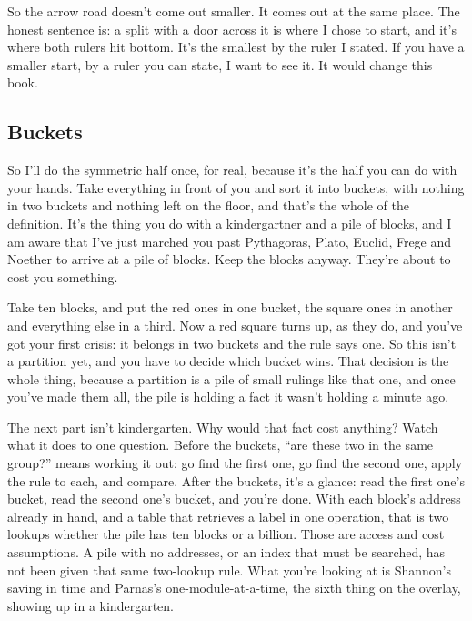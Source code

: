\documentclass[11pt,twoside]{article}
\theoremstyle{thielethm}
\theoremstyle{thieledef}
\theoremstyle{thieledef}
\theoremstyle{thieledef}
\theoremstyle{thielethm}
\theoremstyle{thieleobs}
\theoremstyle{thielethm}
\begin{document}
So the arrow road doesn't come out smaller. It comes out at the same place. The honest sentence is: a split with a door across it is where I chose to start, and it's where both rulers hit bottom. It's the smallest by the ruler I stated. If you have a smaller start, by a ruler you can state, I want to see it. It would change this book.

\subsection{Buckets}

So I'll do the symmetric half once, for real, because it's the half you can do with your hands. Take everything in front of you and sort it into buckets, with nothing in two buckets and nothing left on the floor, and that's the whole of the definition. It's the thing you do with a kindergartner and a pile of blocks, and I am aware that I've just marched you past Pythagoras, Plato, Euclid, Frege and Noether to arrive at a pile of blocks. Keep the blocks anyway. They're about to cost you something.

Take ten blocks, and put the red ones in one bucket, the square ones in another and everything else in a third. Now a red square turns up, as they do, and you've got your first crisis: it belongs in two buckets and the rule says one. So this isn't a partition yet, and you have to decide which bucket wins. That decision is the whole thing, because a partition is a pile of small rulings like that one, and once you've made them all, the pile is holding a fact it wasn't holding a minute ago.

The next part isn't kindergarten. Why would that fact cost anything? Watch what it does to one question. Before the buckets, ``are these two in the same group?'' means working it out: go find the first one, go find the second one, apply the rule to each, and compare. After the buckets, it's a glance: read the first one's bucket, read the second one's bucket, and you're done. With each block's address already in hand, and a table that retrieves a label in one operation, that is two lookups whether the pile has ten blocks or a billion. Those are access and cost assumptions. A pile with no addresses, or an index that must be searched, has not been given that same two-lookup rule. What you're looking at is Shannon's saving in time and Parnas's one-module-at-a-time, the sixth thing on the overlay, showing up in a kindergarten.
\end{document}
